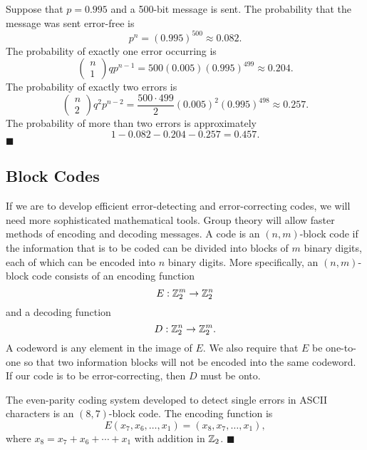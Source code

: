  
Suppose that $p = 0.995$ and a 500-bit message is sent. The
probability that the message was sent error-free is 
\[
p^{n} = (0.995)^{500} \approx 0.082.
\]
The probability of exactly one error occurring is
\[
\left(
\begin{array}{c}
n \\ 1
\end{array}
\right)
qp^{n-1}= 500(0.005)(0.995)^{499}
\approx 0.204.
\]
The probability of exactly two errors is
\[
\left(
\begin{array}{c}
n \\ 2
\end{array}
\right)
q^{2}p^{n-2}=
\frac{500 \cdot 499}{2}(0.005)^{2}(0.995)^{498} \approx
0.257.
\]
The probability of more than two errors is approximately
\[
1-0.082-0.204 -0.257=0.457.
\]
\hspace{\fill} $\blacksquare$
 
 
\subsection*{Block Codes}
 
 
If we are to develop efficient error-detecting and error-correcting
codes, we will need more sophisticated mathematical tools.  Group
theory  will allow faster methods of encoding and decoding messages. A
code is an $(n, m)$-{\bfi block code\/} if the information that is to be
coded can be divided into blocks of $m$ binary digits, each of which
can be encoded into $n$ binary digits. More specifically, an $(n,
m)$-block code consists of an {\bfi encoding function} 
\[
E:{\Bbb Z}^{m}_{2} \rightarrow {\Bbb Z}^{n}_{2}
\]
and a {\bfi decoding function}
\[
D:{\Bbb Z}^{n}_{2} \rightarrow {\Bbb Z}^{m}_{2}.
\]
A {\bfi codeword\/} is any element in the image of $E$. We also require
that $E$ be one-to-one so that two information blocks will not be
encoded into the same codeword. If our code is to be error-correcting,
then $D$ must be onto.
 
 
\vspace{2ex }
 
 
The even-parity coding system developed to detect single errors in
ASCII characters is an $(8,7)$-block code. The encoding function is
\[
E(x_7, x_6, \ldots, x_1) = (x_8, x_7,  \ldots, x_1),
\]
where $x_8 = x_7 + x_6 + \cdots + x_1$ with addition in ${\Bbb Z}_2$. 
\hspace{\fill} $\blacksquare$
 
 
\vspace{2ex}
 
